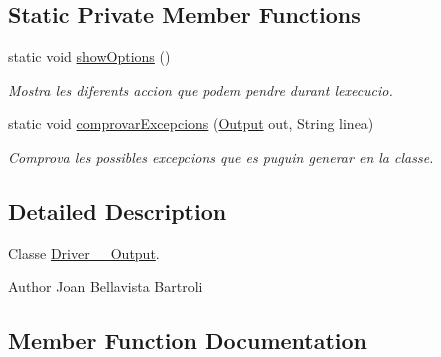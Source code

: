 \subsection*{Static Private Member Functions}
\begin{DoxyCompactItemize}
\item 
\mbox{\label{classpersistencia_1_1output_1_1Driver____Output_a73ae13b88bf305d442012408333aae35}} 
static void \hyperlink{classpersistencia_1_1output_1_1Driver____Output_a73ae13b88bf305d442012408333aae35}{show\+Options} ()
\begin{DoxyCompactList}\small\item\em Mostra les diferents accion que podem pendre durant l\textquotesingle{}execucio. \end{DoxyCompactList}\item 
static void \hyperlink{classpersistencia_1_1output_1_1Driver____Output_a88243f6a932e15c580fcbcc31a21b9bc}{comprovar\+Excepcions} (\hyperlink{classpersistencia_1_1output_1_1Output}{Output} out, String linea)
\begin{DoxyCompactList}\small\item\em Comprova les possibles excepcions que es puguin generar en la classe. \end{DoxyCompactList}\end{DoxyCompactItemize}


\subsection{Detailed Description}
Classe \hyperlink{classpersistencia_1_1output_1_1Driver____Output}{Driver\+\_\+\+\_\+\+Output}. 

\begin{DoxyAuthor}{Author}
Joan Bellavista Bartroli 
\end{DoxyAuthor}


\subsection{Member Function Documentation}
\mbox{\label{classpersistencia_1_1output_1_1Driver____Output_a88243f6a932e15c580fcbcc31a21b9bc}} 
